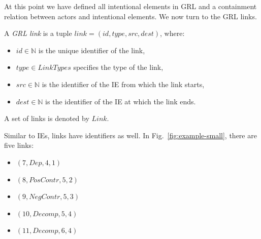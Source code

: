 At this point we have defined all intentional elements in GRL and a containment relation between actors and intentional elements. We now turn to the GRL links.

\begin{definition}
\label{def:link}
A \emph{GRL link} is a tuple $link = (id,type,src,dest)$, where:
\begin{itemize}
\item $id\in \mathbb{N}$ is the unique identifier of the link,
\item $type\in LinkTypes$ specifies the type of the link, 
\item $src\in \mathbb{N}$ is the identifier of the IE from which the link starts,
\item $dest\in \mathbb{N}$ is the identifier of the IE at which the link ends.
\end{itemize}

A set of links is denoted by $Link$.
\end{definition}



Similar to IEs, links have identifiers as well. In Fig.~\ref{fig:example-small}, there are five links:

\begin{itemize}
\item $(7, Dep, 4, 1)$
\item $(8, PosContr, 5, 2)$
\item $(9, NegContr, 5, 3)$
\item $(10, Decomp, 5, 4)$
\item $(11, Decomp, 6, 4)$
\end{itemize}

